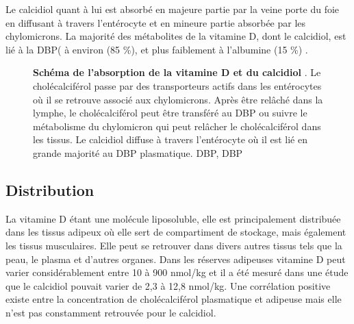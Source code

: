 \documentclass[
  a4paper,
  DIV=11,
  numbers=noendperiod,
  listof=totoc]{scrreprt}
\begin{document}
Le calcidiol quant à lui est absorbé en majeure partie par la veine
porte du foie en diffusant à travers l'entérocyte et en mineure partie
absorbée par les chylomicrons. La majorité des métabolites de la
vitamine D, dont le calcidiol, est lié à la \ac{DBP}( à environ (85 \%),
et plus faiblement à l'albumine (15 \%) \autocite{Bikle.2017}.

\begin{figure}


\caption[Schéma de l'absorption de la vitamine D et du
calcidiol.]{\label{fig-vd-absorption}\textbf{Schéma de l'absorption de
la vitamine D et du calcidiol} \autocite{Schoenmakers.2018}. Le
cholécalciférol passe par des transporteurs actifs dans les entérocytes
où il se retrouve associé aux chylomicrons. Après être relâché dans la
lymphe, le cholécalciférol peut être transféré au \ac{DBP} ou suivre le
métabolisme du chylomicron qui peut relâcher le cholécalciférol dans les
tissus. Le calcidiol diffuse à travers l'entérocyte où il est lié en
grande majorité au \ac{DBP} plasmatique. \ac{DBP}, \acl{DBP}}

\end{figure}%

\subsection{Distribution}\label{distribution}

La vitamine D étant une molécule liposoluble, elle est principalement
distribuée dans les tissus adipeux où elle sert de compartiment de
stockage, mais également les tissus musculaires. Elle peut se retrouver
dans divers autres tissus tels que la peau, le plasma et d'autres
organes. Dans les réserves adipeuses vitamine D peut varier
considérablement entre 10 à 900 nmol/kg et il a été mesuré dans une
étude que le calcidiol pouvait varier de 2,3 à 12,8 nmol/kg. Une
corrélation positive existe entre la concentration de cholécalciférol
plasmatique et adipeuse mais elle n'est pas constamment retrouvée pour
le calcidiol.
\end{document}

